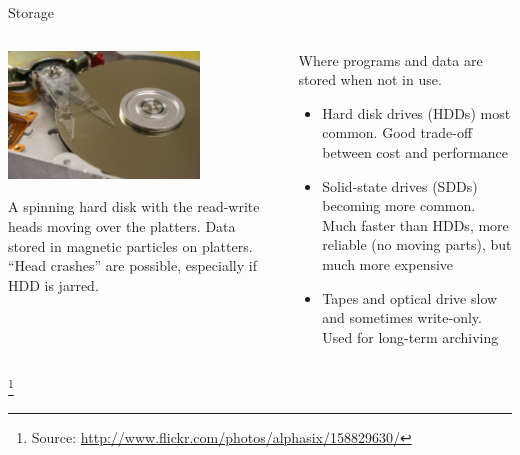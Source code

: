 \documentclass{beamer}
\begin{document}
\begin{frame}{Storage}


\begin{columns}[t]
\begin{column}{2.5in}
\begin{center}
\includegraphics[width=2in]{hdd-spin.jpg}
\end{center}
\small A spinning hard disk with
the read-write heads moving over the platters.  Data stored in
magnetic particles on platters.  ``Head crashes'' are possible,
especially if HDD is jarred.
\normalsize
\end{column}
\begin{column}{2.5in}
Where programs and data are stored when not in use.
\begin{itemize}
\item Hard disk drives (HDDs) most common.  Good trade-off between cost and
  performance
\item Solid-state drives (SDDs) becoming more common.  Much faster
  than HDDs, more reliable (no moving parts), but much more expensive
\item Tapes and optical drive slow and sometimes write-only.  Used for
  long-term archiving
\end{itemize}
\end{column}
\end{columns}
\footnote{Source: \url{http://www.flickr.com/photos/alphasix/158829630/}}

\end{frame}
\end{document}
